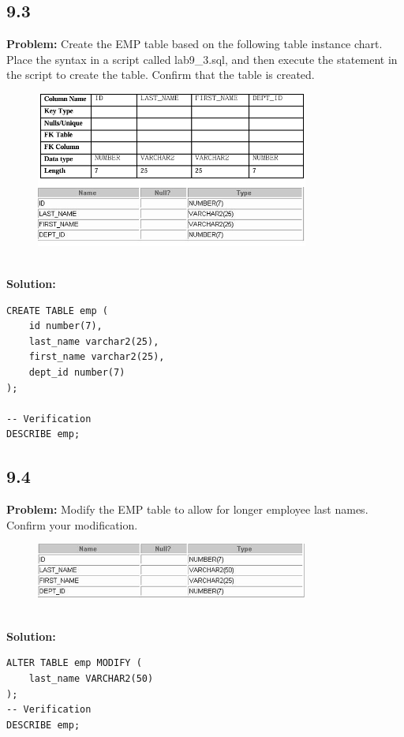 \documentclass[12pt,a4paper]{article}
\begin{document}
\begin{itemize}
\subsection*{9.3}
\textbf{Problem:} Create the EMP table based on the following table instance chart. Place the syntax in a script called lab9\_3.sql, and then execute the statement in the script to create the table. Confirm that the table is created.
\\
\begin{figure}[htbp]
  \centering
  \includegraphics[width=0.8\textwidth]{Screenshots/93.png}
\end{figure}\\
\textbf{Solution:}
\begin{lstlisting}
CREATE TABLE emp (
    id number(7),
    last_name varchar2(25),
    first_name varchar2(25),
    dept_id number(7)
);

-- Verification
DESCRIBE emp;
\end{lstlisting}

\subsection*{9.4}
\textbf{Problem:} Modify the EMP table to allow for longer employee last names. Confirm your modification.
\\
\begin{figure}[htbp]
  \centering
  \includegraphics[width=0.8\textwidth]{Screenshots/94.png}
\end{figure}\\
\newpage
\textbf{Solution:}
\begin{lstlisting}
ALTER TABLE emp MODIFY ( 
    last_name VARCHAR2(50)
);
-- Verification
DESCRIBE emp;
\end{lstlisting}


\end{itemize}
\end{document}
